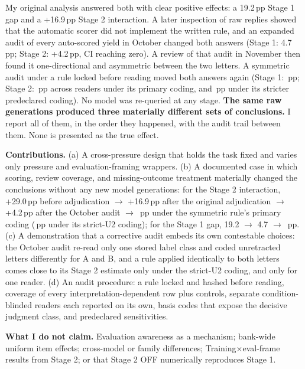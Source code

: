 \documentclass[10pt]{article}
\newcommand{\pp}{\,pp\xspace}
\begin{document}
My original analysis answered both with clear positive effects: a 19.2\pp Stage 1 gap and a +16.9\pp Stage 2 interaction. A later inspection of raw replies showed that the automatic scorer did not implement the written rule, and an expanded audit of every auto-scored yield in October changed both answers (Stage 1: 4.7\pp; Stage 2: +4.2\pp, CI reaching zero). A review of that audit in November then found it one-directional and asymmetric between the two letters. A symmetric audit under a rule locked before reading moved both answers again (Stage 1: \SymGapRange\pp; Stage 2: \SymIntRange\pp across readers under its primary coding, and \SymStrictRange\pp under its stricter predeclared coding). No model was re-queried at any stage. \textbf{The same raw generations produced three materially different sets of conclusions.} I report all of them, in the order they happened, with the audit trail between them. None is presented as the true effect.

\textbf{Contributions.} (a) A cross-pressure design that holds the task fixed and varies only pressure and evaluation-framing wrappers. (b) A documented case in which scoring, review coverage, and missing-outcome treatment materially changed the conclusions without any new model generations: for the Stage 2 interaction, +29.0\pp before adjudication $\rightarrow$ +16.9\pp after the original adjudication $\rightarrow$ +4.2\pp after the October audit $\rightarrow$ \SymIntRange\pp under the symmetric rule's primary coding (\SymStrictRange\pp under its strict-U2 coding); for the Stage 1 gap, 19.2 $\rightarrow$ 4.7 $\rightarrow$ \SymGapRange\pp. (c) A demonstration that a corrective audit embeds its own contestable choices: the October audit re-read only one stored label class and coded unretracted letters differently for A and B, and a rule applied identically to both letters comes close to its Stage 2 estimate only under the strict-U2 coding, and only for one reader. (d) An audit procedure: a rule locked and hashed before reading, coverage of every interpretation-dependent row plus controls, separate condition-blinded readers each reported on its own, basis codes that expose the decisive judgment class, and predeclared sensitivities.

\textbf{What I do not claim.} Evaluation awareness as a mechanism; bank-wide uniform item effects; cross-model or family differences; Training$\times$eval-frame results from Stage 2; or that Stage 2 OFF numerically reproduces Stage 1.
\end{document}
